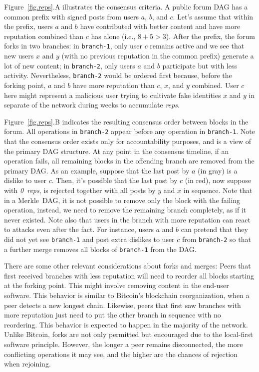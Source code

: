 \documentclass[10pt,journal,compsoc]{IEEEtran}
\newcommand{\reps}     {\emph{reps}\xspace}
\newcommand{\nreps}[1] {\emph{#1~reps\xspace}}
\newcommand{\code}[1]  {\texttt{\footnotesize{#1}}}
\begin{document}
Figure~\ref{fig.reps}.A illustrates the consensus criteria.
A public forum DAG has a common prefix with signed posts from users $a$, $b$,
and $c$.
Let's assume that within the prefix, users $a$ and $b$ have contributed with
better content and have more reputation combined than $c$ has alone (i.e.,
$8+5>3$).
%
After the prefix, the forum forks in two branches:
in \code{branch-1}, only user $c$ remains active and we see that new users $x$
and $y$ (with no previous reputation in the common prefix) generate a lot of
new content;
in \code{branch-2}, only users $a$ and $b$ participate but with less activity.
Nevertheless, \code{branch-2} would be ordered first because, before the
forking point, $a$ and $b$ have more reputation than $c$, $x$, and $y$
combined.
%
User $c$ here might represent a malicious user trying to cultivate fake
identities $x$ and $y$ in separate of the network during weeks to accumulate
\reps.

Figure~\ref{fig.reps}.B indicates the resulting consensus order between blocks
in the forum.
All operations in \code{branch-2} appear before any operation in
\code{branch-1}.
Note that the consensus order exists only for accountability purposes, and is
a view of the primary DAG structure.
At any point in the consensus timeline, if an operation fails, all remaining
blocks in the offending branch are removed from the primary DAG.
As an example, suppose that the last post by $a$ (in gray) is a dislike to user
$c$.
Then, it's possible that the last post by $c$ (in red), now suppose with
\nreps{0}, is rejected together with all posts by $y$ and $x$ in sequence.
%
Note that in a Merkle~DAG, it is not possible to remove only the block with the
failing operation, instead, we need to remove the remaining branch completely,
as if it never existed.
%
Note also that users in the branch with more reputation can react to attacks
even after the fact.
For instance, users $a$ and $b$ can pretend that they did not yet see
\code{branch-1} and post extra dislikes to user $c$ from \code{branch-2} so
that a further merge removes all blocks of \code{branch-1} from the DAG.

There are some other relevant considerations about forks and merges:
%
Peers that first received branches with less reputation will need to reorder
all blocks starting at the forking point.
This might involve removing content in the end-user software.
This behavior is similar to Bitcoin's blockchain reorganization, when a peer
detects a new longest chain. %
%
Likewise, peers that first saw branches with more reputation just need to put
the other branch in sequence with no reordering.
This behavior is expected to happen in the majority of the network.
%
Unlike Bitcoin, forks are not only permitted but encouraged due to the
local-first software principle.
However, the longer a peer remains disconnected, the more conflicting
operations it may see, and the higher are the chances of rejection when
rejoining.
\end{document}
